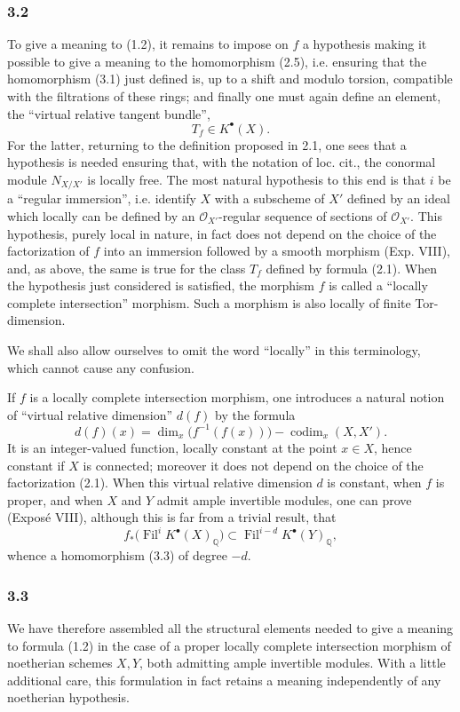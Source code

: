 \documentclass[11pt]{article}
\newcommand{\Fil}{\operatorname{Fil}}
\providecommand{\codim}{\operatorname{codim}}
\begin{document}
\subsubsection*{3.2}
To give a meaning to (1.2), it remains to impose on $f$ a hypothesis making it possible to give a meaning to the homomorphism (2.5), i.e. ensuring that the homomorphism (3.1) just defined is, up to a shift and modulo torsion, compatible with the filtrations of these rings; and finally one must again define an element, the ``virtual relative tangent bundle'',
\[
T_f\in K^\bullet(X).
\]
For the latter, returning to the definition proposed in 2.1, one sees that a hypothesis is needed ensuring that, with the notation of loc. cit., the conormal module $N_{X/X'}$ is locally free. The most natural hypothesis to this end is that $i$ be a ``regular immersion'', i.e. identify $X$ with a subscheme of $X'$ defined by an ideal which locally can be defined by an $\mathcal O_{X'}$-regular sequence of sections of $\mathcal O_{X'}$. This hypothesis, purely local in nature, in fact does not depend on the choice of the factorization of $f$ into an immersion followed by a smooth morphism (Exp. VIII), and, as above, the same is true for the class $T_f$ defined by formula (2.1). When the hypothesis just considered is satisfied, the morphism $f$ is called a ``locally complete intersection'' morphism. Such a morphism is also locally of finite Tor-dimension.

We shall also allow ourselves to omit the word ``locally'' in this terminology, which cannot cause any confusion.

If $f$ is a locally complete intersection morphism, one introduces a natural notion of ``virtual relative dimension'' $d(f)$ by the formula
\[
d(f)(x)=\dim_x\bigl(f^{-1}(f(x))\bigr)-\codim_x(X,X').
\]
It is an integer-valued function, locally constant at the point $x\in X$, hence constant if $X$ is connected; moreover it does not depend on the choice of the factorization (2.1). When this virtual relative dimension $d$ is constant, when $f$ is proper, and when $X$ and $Y$ admit ample invertible modules, one can prove (Expos\'e VIII), although this is far from a trivial result, that
\begin{equation}\tag{3.4}
f_*\bigl(\Fil^i K^\bullet(X)_{\mathbb Q}\bigr)\subset \Fil^{i-d}K^\bullet(Y)_{\mathbb Q},
\end{equation}
whence a homomorphism (3.3) of degree $-d$.

\subsubsection*{3.3}
We have therefore assembled all the structural elements needed to give a meaning to formula (1.2) in the case of a proper locally complete intersection morphism of noetherian schemes $X,Y$, both admitting ample invertible modules. With a little additional care, this formulation in fact retains a meaning independently of any noetherian hypothesis.
\end{document}
